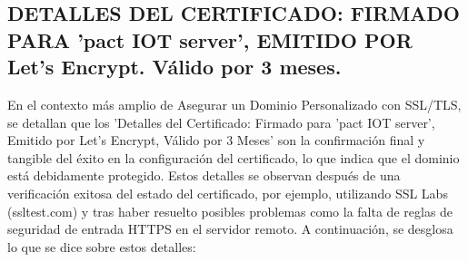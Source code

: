 \documentclass{report}
\begin{document}
\subsection{DETALLES DEL CERTIFICADO: FIRMADO PARA  'pact IOT server', EMITIDO POR Let's Encrypt. Válido por 3 meses.}
En el contexto más amplio de Asegurar un Dominio Personalizado con SSL/TLS, se  detallan que los 'Detalles del Certificado: 
Firmado para 'pact IOT server', Emitido por Let's Encrypt, Válido por 3 Meses' son la confirmación final y tangible del éxito en la 
configuración del certificado, lo que indica que el dominio está debidamente protegido. Estos detalles se observan después de una 
verificación exitosa del estado del certificado, por ejemplo, utilizando SSL Labs (ssltest.com) y tras haber resuelto posibles 
problemas como la falta de reglas de seguridad de entrada HTTPS en el servidor remoto.
A continuación, se desglosa lo que se  dice sobre estos detalles:
\end{document}
